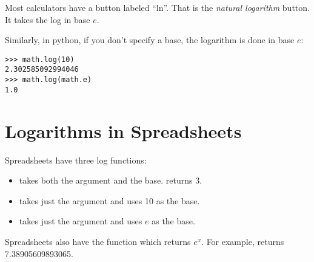 Most calculators have a button labeled ``ln''.  That is the
\textit{natural logarithm} button. It takes the log in base $e$.

Similarly, in python, if you don't specify a base, the logarithm is done in base $e$:

\begin{Verbatim}
>>> math.log(10)
2.302585092994046
>>> math.log(math.e)
1.0
\end{Verbatim}

\section{Logarithms in Spreadsheets}

Spreadsheets have three log functions:
\begin{itemize}
\item {} takes both the argument and the base.  returns 3.
\item {} takes just the argument and uses 10 as the base.
\item {} takes just the argument and uses $e$ as the base.
\end{itemize}

Spreadsheets also have the function  which returns
$e^x$.  For example,  returns 7.38905609893065.
